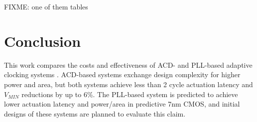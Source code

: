 \documentclass[twoside,9pt,journal,letterpage]{IEEEtran}
\begin{document}
FIXME: one of them tables

\section{Conclusion}
\label{sec:conclusion}

This work compares the costs and effectiveness of ACD- and PLL-based adaptive clocking systems \cite{hashimoto2018,wilcox2015}. ACD-based systems exchange design complexity for higher power and area, but both systems achieve less than 2 cycle actuation latency and $V_{MIN}$ reductions by up to 6\%. The PLL-based system is predicted to achieve lower actuation latency and power/area in predictive 7nm CMOS, and initial designs of these systems are planned to evaluate this claim.


\begingroup
\raggedright

\endgroup
\end{document}
